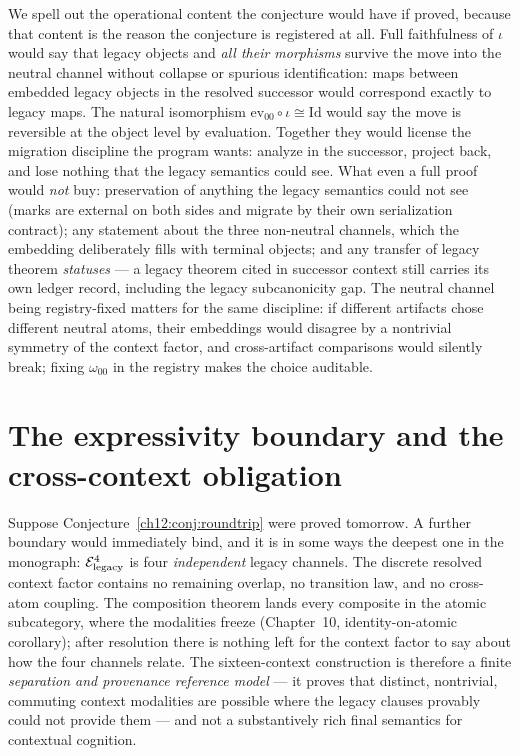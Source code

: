 \begin{remark}
\label{ch12:rem:fullfaithful}
We spell out the operational content the conjecture would have if
proved, because that content is the reason the conjecture is
registered at all. Full faithfulness of $\iota$ would say that legacy
objects and \emph{all their morphisms} survive the move into the
neutral channel without collapse or spurious identification: maps
between embedded legacy objects in the resolved successor would
correspond exactly to legacy maps. The natural isomorphism
$\mathrm{ev}_{00} \circ \iota \cong \mathrm{Id}$ would say the move is
reversible at the object level by evaluation. Together they would
license the migration discipline the program wants: analyze in the
successor, project back, and lose nothing that the legacy semantics
could see. What even a full proof would \emph{not} buy: preservation of
anything the legacy semantics could not see (marks are external on both
sides and migrate by their own serialization contract); any statement
about the three non-neutral channels, which the embedding deliberately
fills with terminal objects; and any transfer of legacy theorem
\emph{statuses} --- a legacy theorem cited in successor context still
carries its own ledger record, including the legacy subcanonicity gap.
The neutral channel being registry-fixed matters for the same
discipline: if different artifacts chose different neutral atoms, their
embeddings would disagree by a nontrivial symmetry of the context
factor, and cross-artifact comparisons would silently break; fixing
$\omega_{00}$ in the registry makes the choice auditable.
\end{remark}

\section{The expressivity boundary and the cross-context obligation}
\label{ch12:sec:expressivity}

Suppose Conjecture~\ref{ch12:conj:roundtrip} were proved tomorrow. A
further boundary would immediately bind, and it is in some ways the deepest
one in the monograph: $\mathcal{E}_{\mathrm{legacy}}^4$ is four \emph{independent} legacy channels.
The discrete resolved context factor contains no remaining overlap, no
transition law, and no cross-atom coupling. The composition theorem lands
every composite in the atomic subcategory, where the modalities freeze
(Chapter~10, identity-on-atomic corollary); after resolution there is
nothing left for the context factor to say about how the four channels
relate. The sixteen-context construction is therefore a finite
\emph{separation and provenance reference model} --- it proves that
distinct, nontrivial, commuting context modalities are possible where the
legacy clauses provably could not provide them --- and not a substantively
rich final semantics for contextual cognition.

